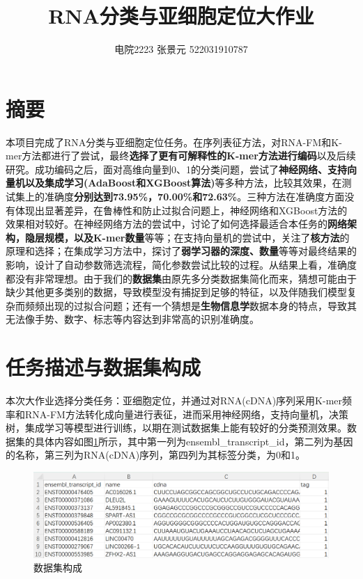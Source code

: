 \documentclass[a4paper,11pt,AutoFakeBold]{ctexart}
\title{\textbf{RNA分类与亚细胞定位大作业}}
\author{电院2223 张景元 522031910787}
\date{}
\begin{document}
\maketitle

\section*{摘要}
本项目完成了RNA分类与亚细胞定位任务。在序列表征方法，对RNA-FM和K-mer方法都进行了尝试，最终\textbf{选择了更有可解释性的K-mer方法进行编码}以及后续研究。成功编码之后，面对高维向量到0、1的分类问题，尝试了\textbf{神经网络、支持向量机以及集成学习(AdaBoost和XGBoost算法)}等多种方法，比较其效果，在测试集上的准确度\textbf{分别达到73.95\%，70.00\%和72.63\%}。三种方法在准确度方面没有体现出显著差异，在鲁棒性和防止过拟合问题上，神经网络和XGBoost方法的效果相对较好。在神经网络方法的尝试中，讨论了如何选择最适合本任务的\textbf{网络架构，隐层规模，以及K-mer数量}等等；在支持向量机的尝试中，关注了\textbf{核方法}的原理和选择；在集成学习方法中，探讨了\textbf{弱学习器的深度、数量}等等对最终结果的影响，设计了自动参数筛选流程，简化参数尝试比较的过程。从结果上看，准确度都没有非常理想。由于我们的\textbf{数据集}由原先多分类数据集简化而来，猜想可能由于缺少其他更多类别的数据，导致模型没有捕捉到足够的特征，以及伴随我们模型复杂而频频出现的过拟合问题；还有一个猜想是\textbf{生物信息学}数据本身的特点，导致其无法像手势、数字、标志等内容达到非常高的识别准确度。



\section{任务描述与数据集构成}
本次大作业选择分类任务：亚细胞定位，并通过对RNA(cDNA)序列采用K-mer频率和RNA-FM方法转化成向量进行表征，进而采用神经网络，支持向量机，决策树，集成学习等模型进行训练，以期在测试数据集上能有较好的分类预测效果。数据集的具体内容如图\ref{fig:数据集构成}所示，其中第一列为ensembl\_transcript\_id，第二列为基因的名称，第三列为RNA(cDNA)序列，第四列为其标签分类，为0和1。


\begin{figure}[h]  
    \centering
    \includegraphics[width=0.8\linewidth]{Figures/数据集展示.png}
        \caption{数据集构成}
        \label{fig:数据集构成}
\end{figure}
\end{document}
